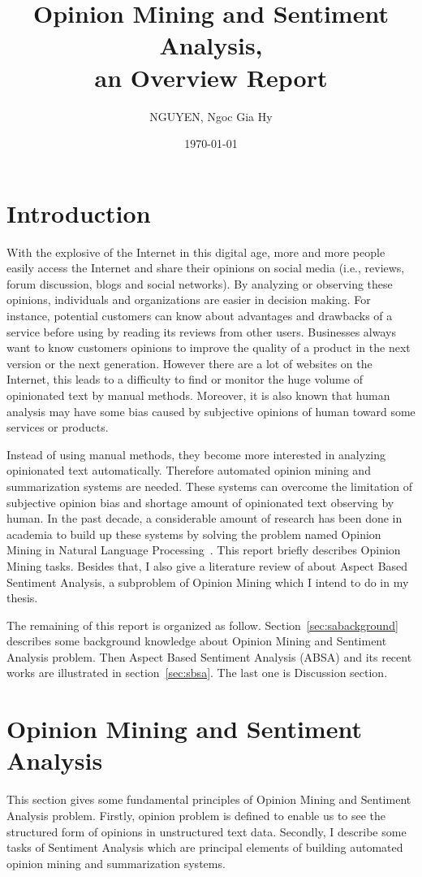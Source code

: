 \documentclass{article}
\title{Opinion Mining and Sentiment Analysis,\\ an Overview Report}
\author{NGUYEN, Ngoc Gia Hy }
\date{\today}
\begin{document}
\maketitle

\section{Introduction}

With the explosive of the Internet in this digital age, more and more people easily access the Internet and share their opinions on social media (i.e., reviews, forum discussion, blogs and social networks). 
By analyzing or observing these opinions, individuals and organizations are easier in decision making. 
For instance, potential customers can know about advantages and drawbacks of a service before using by reading its reviews from other users.
Businesses always want to know customers opinions to improve the quality of a product in the next version or the next generation. 
However there are a lot of websites on the Internet, this leads to a difficulty to find or monitor the huge volume of opinionated text by manual methods.
Moreover, it is also known that human analysis may have some bias caused by subjective opinions of human toward some services or products.

Instead of using manual methods, they become more interested in analyzing opinionated text automatically.
Therefore automated opinion mining and summarization systems are needed.
These systems can overcome the limitation of subjective opinion bias and shortage amount of opinionated text observing by human.
In the past decade, a considerable amount of research has been done in academia to build up these systems by solving the problem named Opinion Mining in Natural Language Processing~\cite{Liu10sentimentanalysis,Pang:2008:OMS:1454711.1454712}.
This report briefly describes Opinion Mining tasks.
Besides that, I also give a literature review of about Aspect Based Sentiment Analysis, a subproblem of Opinion Mining which I intend to do in my thesis.

The remaining of this report is organized as follow.
Section~\ref{sec:sabackground} describes some background knowledge about Opinion Mining and Sentiment Analysis problem. 
Then Aspect Based Sentiment Analysis (ABSA) and its recent works are illustrated in section~\ref{sec:sbsa}. 
The last one is Discussion section.

\section{Opinion Mining and Sentiment Analysis}
This section gives some fundamental principles of Opinion Mining and Sentiment Analysis problem.
Firstly, opinion problem is defined to enable us to see the structured form of opinions in unstructured text data.
Secondly, I describe some tasks of Sentiment Analysis which are principal elements of building automated opinion mining and summarization systems.
\end{document}
